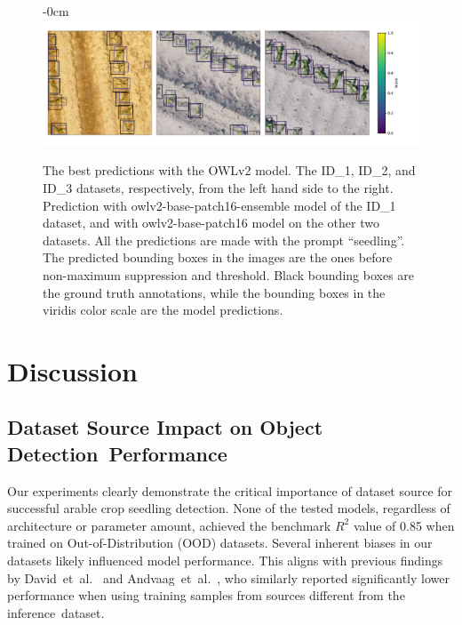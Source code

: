 \documentclass[12pt,a4paper,oneside]{report}
\newlength{\extralength}
\begin{document}
\begin{landscape}
\begin{figure}
  \begin{adjustwidth}{-\extralength}{0cm}
   \centering
  \includegraphics[width=22cm]{Plots/zeroshot_images.pdf}
  \end{adjustwidth}
  \caption{The best predictions with the OWLv2 model.  
  The ID\_1, ID\_2, and ID\_3 datasets, respectively, from the left hand side to the right.
  Prediction with owlv2-base-patch16-ensemble model of the ID\_1 dataset,
  and with owlv2-base-patch16 model on the other two datasets.
  All the predictions are made with the prompt ``seedling''.
  The predicted bounding boxes in the images are the ones before 
  non-maximum suppression and threshold.
  Black bounding boxes are the ground truth annotations, while the bounding boxes 
  in the viridis color scale are the model predictions.}
  \label{fig:annotations_zero-shot}
\end{figure}
\end{landscape}

\section{Discussion}
\unskip

\subsection{Dataset Source Impact on Object Detection~Performance}
Our experiments clearly demonstrate the critical importance of dataset source 
for successful arable crop seedling detection. None of the tested models, regardless 
of architecture or parameter amount, achieved the benchmark $R^2$ value of 0.85 
when trained on Out-of-Distribution (OOD) datasets. 
Several inherent biases in our datasets likely influenced model performance.
This aligns with previous findings 
by David~et~al.~\cite{davidPlantDetectionCounting2021}  and Andvaag~et~al.~\cite{andvaagCountingCanolaGeneralizable2024}, 
who similarly reported significantly 
lower performance when using training samples from sources different from the inference~dataset.
\end{document}

